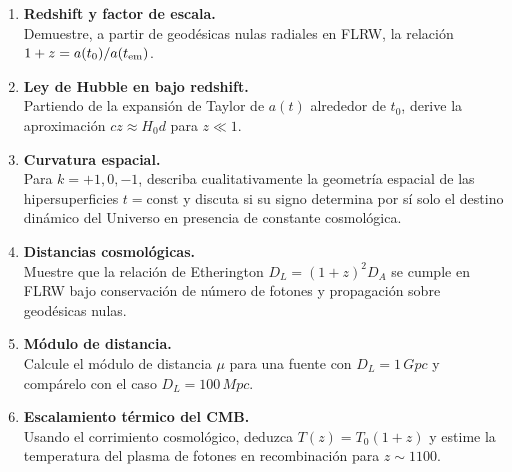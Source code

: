 \begin{enumerate}[leftmargin=2.2em, label=\textbf{P\arabic*.}]

\item \textbf{Redshift y factor de escala.} \\
Demuestre, a partir de geodésicas nulas radiales en FLRW, la relación $1+z=a(t_0)/a(t_{\rm em})$.

\item \textbf{Ley de Hubble en bajo redshift.} \\
Partiendo de la expansión de Taylor de $a(t)$ alrededor de $t_0$, derive la aproximación $cz\approx H_0 d$ para $z\ll1$.

\item \textbf{Curvatura espacial.} \\
Para $k=+1,0,-1$, describa cualitativamente la geometría espacial de las hipersuperficies $t=\text{const}$ y discuta si su signo determina por sí solo el destino dinámico del Universo en presencia de constante cosmológica.

\item \textbf{Distancias cosmológicas.} \\
Muestre que la relación de Etherington $D_L=(1+z)^2D_A$ se cumple en FLRW bajo conservación de número de fotones y propagación sobre geodésicas nulas.

\item \textbf{Módulo de distancia.} \\
Calcule el módulo de distancia $\mu$ para una fuente con $D_L=1\,\si{Gpc}$ y compárelo con el caso $D_L=100\,\si{Mpc}$.

\item \textbf{Escalamiento térmico del CMB.} \\
Usando el corrimiento cosmológico, deduzca $T(z)=T_0(1+z)$ y estime la temperatura del plasma de fotones en recombinación para $z\sim1100$.

\end{enumerate}
